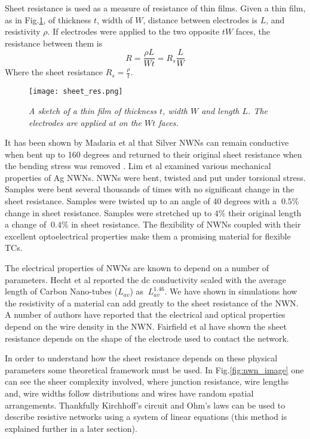 Sheet resistance is used as a measure of resistance of thin films. Given a thin film, as in Fig.\ref{fig:sh_res}, of thickness $t$, width of $W$, distance between electrodes is $L$, and resistivity $\rho$. If electrodes were applied to the two opposite $tW$ faces, the resistance between them is
\begin{equation}
R = \frac{\rho L}{W t} = R_s \frac{L}{W}
\end{equation}
Where the sheet resistance $R_s = \frac{\rho}{t}$.

\begin{figure}[ht!]
\centering
\texttt{[image: sheet\_res.png]}
\caption{\fontsize{10pt}{9pt}\selectfont \textit{A sketch of a thin film of thickness $t$, width $W$ and length $L$. The electrodes are applied at on the $Wt$ faces.}}
\label{fig:sh_res}
\end{figure}

It has been shown by Madaria et al that Silver NWNs can remain conductive when bent up to 160 degrees and returned to their original sheet resistance when the bending stress was removed \cite{madaria2010}. Lim et al \cite{lim2012} examined various mechanical properties of Ag NWNs. NWNs were bent, twisted and put under torsional stress. Samples were bent several thousands of times with no significant change in the sheet resistance. Samples were twisted up to an angle of 40 degrees with a $~0.5\%$ change in sheet resistance. Samples were stretched up to $4\%$ their original length a change of $~0.4\%$ in sheet resistance. The flexibility of NWNs coupled with their excellent optoelectrical properties make them a promising material for flexible TCs. 

The electrical properties of NWNs are known to depend on a number of parameters. Hecht et al reported the dc conductivity scaled with the average length of Carbon Nano-tubes ($L_{av}$) as $~L_{av}^{1.46}$\cite{hecht2006}. We have shown in simulations how the resistivity of a material can add greatly to the sheet resistance of the NWN\cite{rocha2015}. A number of authors have reported that the electrical and optical properties depend on the wire density in the NWN\cite{mutiso2013,tenent2009,hecht2011}. Fairfield et al have shown the sheet resistance depends on the shape of the electrode used to contact the network\cite{fairfield2014}. 

In order to understand how the sheet resistance depends on these physical parameters some theoretical framework must be used. In Fig.\ref{fig:nwn_image} one can see the sheer complexity involved, where junction resistance, wire lengths and, wire widths follow distributions and wires have random spatial arrangements. Thankfully Kirchhoff's circuit and Ohm's laws can be used to describe resistive networks using a system of linear equations (this method is explained further in a later section).

